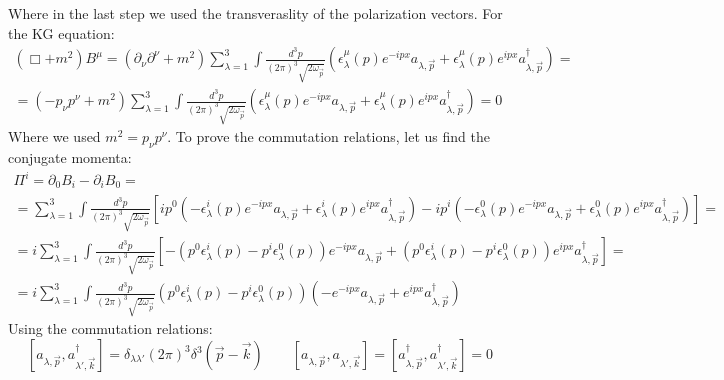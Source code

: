 \documentclass{article}
\begin{document}
Where in the last step we used the transveraslity of the polarization vectors. For the KG equation:
\begin{equation}
\begin{gathered}
    \left(\Box + m^2\right)B^\mu =
    \left(\partial_\nu \partial^\nu + m^2\right) \sum_{\lambda=1}^3 \int\frac{d^3p}{(2\pi)^3\sqrt{2\omega_{\vec{p}}}} \left(
        \epsilon_\lambda^\mu(p)e^{-ipx} a_{\lambda, \vec{p}} +
        \epsilon_\lambda^\mu(p)e^{ipx} a^\dagger_{\lambda, \vec{p}}
    \right) = \\ =
    \left(-p_\nu p^\nu + m^2\right) \sum_{\lambda=1}^3 \int\frac{d^3p}{(2\pi)^3\sqrt{2\omega_{\vec{p}}}} \left(
        \epsilon_\lambda^\mu(p)e^{-ipx} a_{\lambda, \vec{p}} +
        \epsilon_\lambda^\mu(p)e^{ipx} a^\dagger_{\lambda, \vec{p}}
    \right) = 0
\end{gathered}
\end{equation}
Where we used $m^2 = p_\nu p^\nu$. To prove the commutation relations, let us find the conjugate momenta:
\begin{equation}
\begin{gathered}
    \Pi^i = \partial_0 B_i - \partial_i B_0 = \\ =
    \sum_{\lambda=1}^3 \int\frac{d^3p}{(2\pi)^3\sqrt{2\omega_{\vec{p}}}}
    \left[
        ip^0\left(
            - \epsilon_\lambda^i(p)e^{-ipx} a_{\lambda, \vec{p}} +
            \epsilon_\lambda^i(p)e^{ipx} a^\dagger_{\lambda, \vec{p}}
        \right) -
        ip^i\left(
            - \epsilon_\lambda^0(p)e^{-ipx} a_{\lambda, \vec{p}} +
            \epsilon_\lambda^0(p)e^{ipx} a^\dagger_{\lambda, \vec{p}}
        \right)
    \right] = \\ =
    i\sum_{\lambda=1}^3 \int\frac{d^3p}{(2\pi)^3\sqrt{2\omega_{\vec{p}}}}
    \left[
        -\left(p^0\epsilon_\lambda^i(p) - p^i \epsilon_\lambda^0(p)\right)e^{-ipx} a_{\lambda, \vec{p}}
        +
        \left(p^0\epsilon_\lambda^i(p) - p^i \epsilon_\lambda^0(p)\right)e^{ipx} a^\dagger_{\lambda, \vec{p}}
    \right] = \\ =
    i\sum_{\lambda=1}^3 \int\frac{d^3p}{(2\pi)^3\sqrt{2\omega_{\vec{p}}}}
    \left(p^0\epsilon_\lambda^i(p) - p^i \epsilon_\lambda^0(p)\right)
    \left(
        - e^{-ipx} a_{\lambda, \vec{p}}
        + e^{ipx} a^\dagger_{\lambda, \vec{p}}
    \right)
\end{gathered}
\end{equation}
Using the commutation relations:
\begin{equation}
    \left[a_{\lambda, \vec{p}}, a_{\lambda', \vec{k}}^\dagger\right] = \delta_{\lambda \lambda'}(2\pi)^3\delta^3(\vec{p} - \vec{k})
    \qquad
    \left[a_{\lambda, \vec{p}}, a_{\lambda', \vec{k}}\right] =
    \left[a_{\lambda, \vec{p}}^\dagger, a_{\lambda', \vec{k}}^\dagger\right] =
    0
\end{equation}
\end{document}
